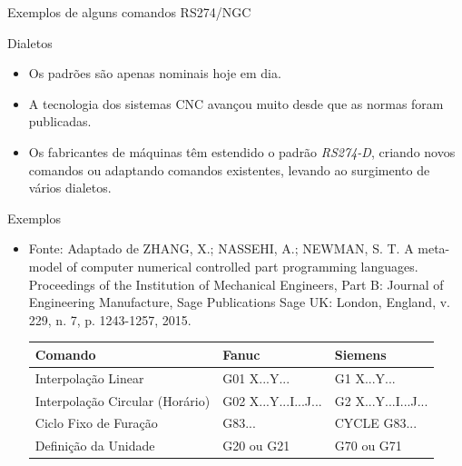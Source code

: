 \documentclass[aspectratio=169]{beamer}
\begin{document}
{\begin{frame}{Exemplos de alguns comandos RS274/NGC}
\end{frame}


\begin{frame}{Dialetos}
  \begin{itemize}
  \item {
    Os padrões são apenas nominais hoje em dia.     
  }
  \item {   
    A tecnologia dos sistemas CNC avançou muito desde que as normas 
    foram publicadas.
  }
  \item {
    Os fabricantes de máquinas têm estendido o padrão \emph{RS274-D}, 
    criando novos comandos ou adaptando comandos existentes, levando 
    ao surgimento de vários dialetos. 
  }
  \end{itemize}
\end{frame}


\begin{frame}{Exemplos}
  \begin{itemize}
    \item {
      Fonte: Adaptado de ZHANG, X.; NASSEHI, A.; NEWMAN, S. T. A meta-model of computer numerical
      controlled part programming languages. Proceedings of the Institution of
      Mechanical Engineers, Part B: Journal of Engineering Manufacture, Sage
      Publications Sage UK: London, England, v. 229, n. 7, p. 1243-1257, 2015.
      \begin{table}[H]
        \centering    
        {\begin{tabular}{p{4.3cm}|p{2.6cm}|p{2.4cm}}
          \hline
          \bfseries{\footnotesize{Comando}} & 
          \bfseries{\footnotesize{Fanuc}} & 
          \bfseries{\footnotesize{Siemens}} \\
      
          \hline
          \footnotesize{Interpolação Linear} & 
          \footnotesize{G01 X...Y...} & 
          \footnotesize{G1 X...Y...} \\
      
          \hline
          \footnotesize{Interpolação Circular (Horário)} & 
          \footnotesize{G02 X...Y...I...J...} & 
          \footnotesize{G2 X...Y...I...J...} \\
      
          \hline
          \footnotesize{Ciclo Fixo de Furação} & 
          \footnotesize{G83...} & 
          \footnotesize{CYCLE G83...} \\
      
          \hline
          \footnotesize{Definição da Unidade} & 
          \footnotesize{G20 ou G21 } & 
          \footnotesize{G70 ou G71} \\


\end{tabular}}
\end{table}}
\end{itemize}
\end{frame}}
\end{document}
